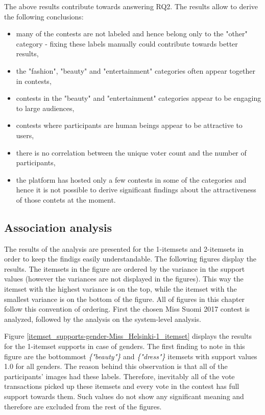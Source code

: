     The above results contribute towards answering RQ2. The results allow to derive the following conclusions: 

    \begin{itemize}
        \item many of the contests are not labeled and hence belong only to the "other" category - fixing these labels manually could contribute towards better results,
        \item the "fashion", "beauty" and "entertainment" categories often appear together in contests,
        \item contests in the "beauty" and "entertainment" categories appear to be engaging to large audiences,
        \item contests where participants are human beings appear to be attractive to users,
        \item there is no correlation between the unique voter count and the number of participants,
        \item the platform has hosted only a few contests in some of the categories and hence it is not possible to derive significant findings about the attractiveness of those contets at the moment.
    \end{itemize}

\subsection{Association analysis}
The results of the analysis are presented for the 1-itemsets and 2-itemsets in order to keep the findigs easily understandable. The following figures display the results. The itemsets in the figure are ordered by the variance in the support values (however the variances are not displayed in the figures). This way the itemset with the highest variance is on the top, while the itemset with the smallest variance is on the bottom of the figure. All of figures in this chapter follow this convention of ordering. First the chosen Miss Suomi 2017 contest is analyzed, followed by the analysis on the system-level analysis.

Figure \ref{itemset_supports-gender-Miss_Helsinki-1_itemset} displays the results for the 1-itemset supports in case of genders. The first finding to note in this figure are the bottommost \textit{\{"beauty"\}} and \textit{\{"dress"\}} itemsets with support values 1.0 for all genders. The reason behind this observation is that all of the participants' images had these labels. Therefore, inevitably all of the vote transactions picked up these itemsets and every vote in the contest has full support towards them. Such values do not show any significant meaning and therefore are excluded from the rest of the figures.

